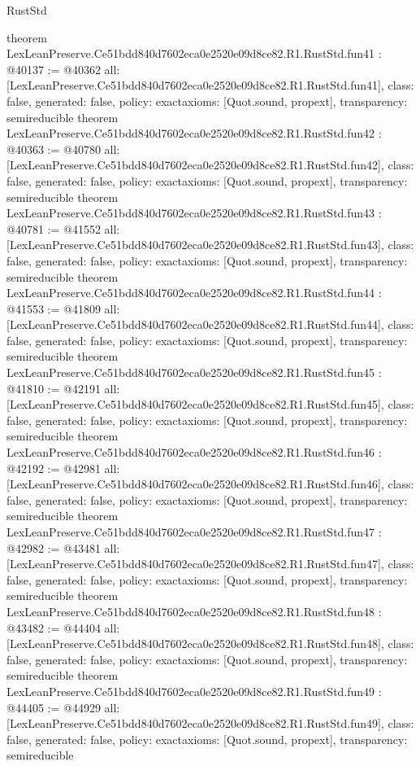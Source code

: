 \begin{lexlean}{RustStd}
\begin{coremodule}
{}
theorem LexLeanPreserve.Ce51bdd840d7602eca0e2520e09d8ce82.R1.RustStd.fun41 : @40137 := @40362 {
  all: [LexLeanPreserve.Ce51bdd840d7602eca0e2520e09d8ce82.R1.RustStd.fun41],
  class: false,
  generated: false,
  policy: exact{axioms: [Quot.sound, propext]},
  transparency: semireducible
}
theorem LexLeanPreserve.Ce51bdd840d7602eca0e2520e09d8ce82.R1.RustStd.fun42 : @40363 := @40780 {
  all: [LexLeanPreserve.Ce51bdd840d7602eca0e2520e09d8ce82.R1.RustStd.fun42],
  class: false,
  generated: false,
  policy: exact{axioms: [Quot.sound, propext]},
  transparency: semireducible
}
theorem LexLeanPreserve.Ce51bdd840d7602eca0e2520e09d8ce82.R1.RustStd.fun43 : @40781 := @41552 {
  all: [LexLeanPreserve.Ce51bdd840d7602eca0e2520e09d8ce82.R1.RustStd.fun43],
  class: false,
  generated: false,
  policy: exact{axioms: [Quot.sound, propext]},
  transparency: semireducible
}
theorem LexLeanPreserve.Ce51bdd840d7602eca0e2520e09d8ce82.R1.RustStd.fun44 : @41553 := @41809 {
  all: [LexLeanPreserve.Ce51bdd840d7602eca0e2520e09d8ce82.R1.RustStd.fun44],
  class: false,
  generated: false,
  policy: exact{axioms: [Quot.sound, propext]},
  transparency: semireducible
}
theorem LexLeanPreserve.Ce51bdd840d7602eca0e2520e09d8ce82.R1.RustStd.fun45 : @41810 := @42191 {
  all: [LexLeanPreserve.Ce51bdd840d7602eca0e2520e09d8ce82.R1.RustStd.fun45],
  class: false,
  generated: false,
  policy: exact{axioms: [Quot.sound, propext]},
  transparency: semireducible
}
theorem LexLeanPreserve.Ce51bdd840d7602eca0e2520e09d8ce82.R1.RustStd.fun46 : @42192 := @42981 {
  all: [LexLeanPreserve.Ce51bdd840d7602eca0e2520e09d8ce82.R1.RustStd.fun46],
  class: false,
  generated: false,
  policy: exact{axioms: [Quot.sound, propext]},
  transparency: semireducible
}
theorem LexLeanPreserve.Ce51bdd840d7602eca0e2520e09d8ce82.R1.RustStd.fun47 : @42982 := @43481 {
  all: [LexLeanPreserve.Ce51bdd840d7602eca0e2520e09d8ce82.R1.RustStd.fun47],
  class: false,
  generated: false,
  policy: exact{axioms: [Quot.sound, propext]},
  transparency: semireducible
}
theorem LexLeanPreserve.Ce51bdd840d7602eca0e2520e09d8ce82.R1.RustStd.fun48 : @43482 := @44404 {
  all: [LexLeanPreserve.Ce51bdd840d7602eca0e2520e09d8ce82.R1.RustStd.fun48],
  class: false,
  generated: false,
  policy: exact{axioms: [Quot.sound, propext]},
  transparency: semireducible
}
theorem LexLeanPreserve.Ce51bdd840d7602eca0e2520e09d8ce82.R1.RustStd.fun49 : @44405 := @44929 {
  all: [LexLeanPreserve.Ce51bdd840d7602eca0e2520e09d8ce82.R1.RustStd.fun49],
  class: false,
  generated: false,
  policy: exact{axioms: [Quot.sound, propext]},
  transparency: semireducible
}
\end{coremodule}
\end{lexlean}
